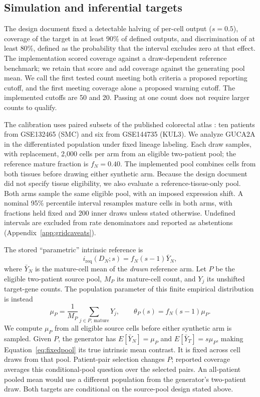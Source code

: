 \subsection{Simulation and inferential targets}
The design document fixed a detectable halving of per-cell output ($s=0.5$),
coverage of the target in at least $90\%$ of defined outputs, and discrimination of at least $80\%$, defined as the probability
that the interval excludes zero at that effect. The implementation scored coverage against a draw-dependent reference benchmark;
we retain that score and add coverage against the generating pool mean.
We call the first tested count meeting both criteria a proposed reporting
cutoff, and the first meeting coverage alone a proposed warning cutoff.
The implemented cutoffs are 50 and 20. Passing at one count does not require
larger counts to qualify.

The calibration uses paired subsets of the published colorectal atlas
\citep{lee2020}: ten patients from GSE132465 (SMC) and six from
GSE144735 (KUL3). We analyze GUCA2A in the differentiated population under fixed
lineage labeling. Each draw samples, with replacement, 2{,}000 cells per arm
from an eligible two-patient pool; the reference mature fraction is $f_N=0.40$.
The implemented pool combines cells from both tissues before drawing either
synthetic arm. Because the design document did not specify tissue eligibility,
we also evaluate a reference-tissue-only pool. Both arms sample the same eligible pool, with an imposed expression shift. A nominal 95\% percentile interval resamples mature cells in
both arms, with fractions held fixed and 200 inner draws unless stated otherwise.
Undefined intervals are excluded from rate denominators and reported as
abstentions (Appendix~\ref{app:gridcaveats}).

The stored ``parametric'' intrinsic reference is
\begin{equation}
i_{\mathrm{req}}(D_N;s)=f_N(s-1)\bar Y_N,
\label{eq:requested}
\end{equation}
where $\bar Y_N$ is the mature-cell mean of the \emph{drawn} reference arm.
Let $P$ be the eligible two-patient source pool, $M_P$ its mature-cell count,
and $Y_j$ its unshifted target-gene counts. The population parameter of this
finite empirical distribution is instead
\begin{equation}
\mu_P=\frac{1}{M_P}\sum_{j\in P,\,\mathrm{mature}}Y_j,
\qquad \theta_P(s)=f_N(s-1)\mu_P.
\label{eq:fixedpool}
\end{equation}
We compute $\mu_P$ from all eligible source cells before either synthetic arm
is sampled. Given $P$, the generator has $E[\bar Y_N]=\mu_P$ and
$E[\bar Y_T]=s\mu_P$, making Equation~\ref{eq:fixedpool} its true intrinsic
mean contrast. It is fixed across cell draws from that pool. Patient-pair
selection changes $P$; reported coverage averages this conditional-pool
question over the selected pairs. An all-patient pooled mean would use a
different population from the generator's two-patient draw. Both targets are conditional on the source-pool design stated above.

